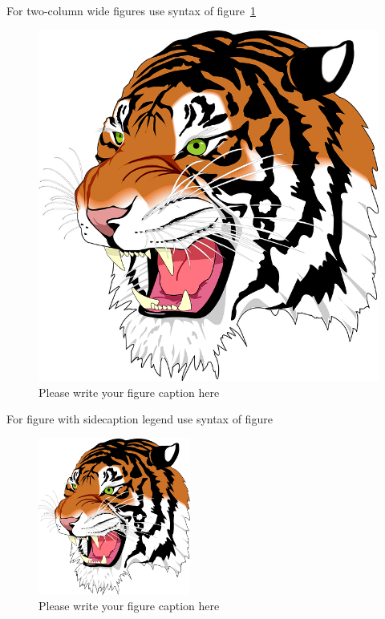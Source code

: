 \documentclass[twocolumn]{webofc}
\begin{document}
For two-column wide figures use syntax of figure~\ref{fig-2}
\begin{figure}
\centering
\vspace*{5cm}       %
\includegraphics[width=\columnwidth,clip]{tiger}
\caption{Please write your figure caption here}
\label{fig-2}       %
\end{figure}

For figure with sidecaption legend use syntax of figure
\begin{figure}
\centering
\sidecaption
\includegraphics[width=5cm,clip]{tiger}
\caption{Please write your figure caption here}
\label{fig-3}       %
\end{figure}
\end{document}
